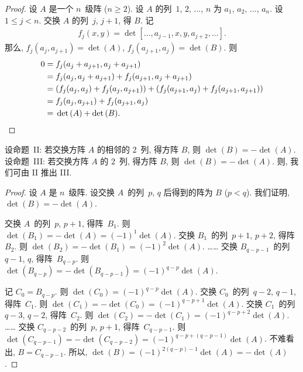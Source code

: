 \documentclass[../libro.tex]{subfiles}
\begin{document}
\begin{proof}
    设 \(A\) 是一个 \(n\)~级阵 (\(n \geq 2\)).
    设 \(A\) 的列~\(1\), \(2\), \(\dots\), \(n\)
    为 \(a_1\), \(a_2\), \(\dots\), \(a_n\).
    设 \(1 \leq j < n\).
    交换 \(A\) 的列~\(j\), \(j+1\), 得 \(B\).
    记
    \begin{align*}
        f_j (x, y)
        = \det {[\dots, a_{j-1}, x, y, a_{j+2}, \dots]}.
    \end{align*}
    那么,
    \(f_j (a_j, a_{j+1}) = \det {(A)}\),
    \(f_j (a_{j+1}, a_j) = \det {(B)}\).
    则
    \begin{align*}
        0
        = {} & f_j (a_j + a_{j+1}, a_j + a_{j+1})
        \\
        = {} & f_j (a_j, a_j + a_{j+1})
        + f_j (a_{j+1}, a_j + a_{j+1})
        \\
        = {} & (f_j (a_j, a_j) + f_j (a_j, a_{j+1}))
        + (f_j (a_{j+1}, a_j) + f_j (a_{j+1}, a_{j+1}))
        \\
        = {} & f_j (a_j, a_{j+1}) + f_j (a_{j+1}, a_j)
        \\
        = {} & \det {(A)} + \det {(B)}.
        \qedhere
    \end{align*}
\end{proof}

\begin{theorem}
    设命题~II:
    若交换方阵 \(A\) 的相邻的 \(2\)~列, 得方阵 \(B\),
    则 \(\det {(B)} = -\det {(A)}\).
    设命题~III:
    若交换方阵 \(A\) 的 \(2\)~列, 得方阵 \(B\),
    则 \(\det {(B)} = -\det {(A)}\).
    则, 我们可由 II 推出 III.
\end{theorem}

\begin{proof}
    设 \(A\) 是 \(n\)~级阵.
    设交换 \(A\)~的列~\(p\), \(q\) 后得到的阵为 \(B\)
    (\(p < q\)).
    我们证明,
    \(\det {(B)} = -\det {(A)}\).

    交换 \(A\)~的列~\(p\), \(p+1\), 得阵~\(B_1\).
    则 \(\det {(B_1)} = -\det {(A)}
    = (-1)^{1} \det {(A)}\).
    交换 \(B_1\)~的列~\(p+1\), \(p+2\), 得阵~\(B_2\).
    则 \(\det {(B_2)} = -\det {(B_1)}
    = (-1)^{2} \det {(A)}\).
    ……
    交换 \(B_{q-p-1}\)~的列~\(q-1\), \(q\), 得阵~\(B_{q-p}\).
    则 \(\det {(B_{q-p})} = -\det {(B_{q-p-1})}
    = (-1)^{q-p} \det {(A)}\).

    记 \(C_0 = B_{q-p}\).
    则 \(\det {(C_0)} = (-1)^{q-p} \det {(A)}\).
    交换 \(C_0\)~的列~\(q-2\), \(q-1\), 得阵~\(C_1\).
    则 \(\det {(C_1)} = -\det {(C_0)}
    = (-1)^{q-p+1} \det {(A)}\).
    交换 \(C_1\)~的列~\(q-3\), \(q-2\), 得阵~\(C_2\).
    则 \(\det {(C_2)} = -\det {(C_1)}
    = (-1)^{q-p+2} \det {(A)}\).
    ……
    交换 \(C_{q-p-2}\)~的列~\(p\), \(p+1\),
    得阵~\(C_{q-p-1}\).
    则 \(\det {(C_{q-p-1})} = -\det {(C_{q-p-2})}
    = (-1)^{q-p+(q-p-1)} \det {(A)}\).
    不难看出, \(B = C_{q-p-1}\).
    所以,
    \(\det {(B)} = (-1)^{2(q-p)-1} \det {(A)}
    = -\det {(A)}\).

\end{proof}
\end{document}
